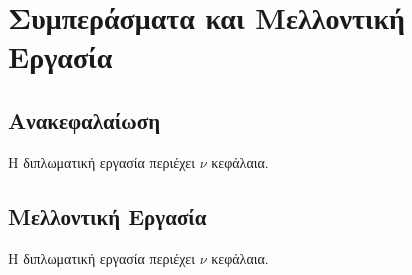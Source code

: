 \chapter{Συμπεράσματα και Μελλοντική Εργασία}
\label{ch:Conclusion and Future Work}

\section{Ανακεφαλαίωση}
\label{sec:Recap}
Η διπλωματική εργασία περιέχει $\nu$ κεφάλαια.

\section{Μελλοντική Εργασία}
\label{sec:Future Work}
Η διπλωματική εργασία περιέχει $\nu$ κεφάλαια.
